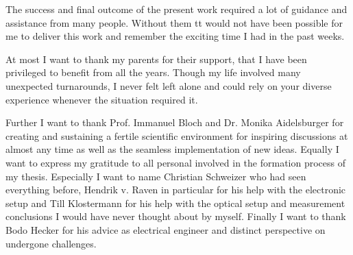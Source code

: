 
The success and final outcome of the present work required a lot of guidance
and assistance from many people. Without them tt would not have been possible
for me to deliver this work and remember the exciting time I had in the past
weeks.

At most I want to thank my parents for their support, that I have been
privileged to benefit from all the years. Though my life involved many
unexpected turnarounds, I never felt left alone and could rely on your
diverse experience whenever the situation required it.

Further I want to thank Prof. Immanuel Bloch and Dr. Monika Aidelsburger for
creating and sustaining a fertile scientific environment for inspiring
discussions at almost any time as well as the seamless implementation of new
ideas.
Equally I want to express my gratitude to all personal involved in the
formation process of my thesis. Especially I want to name Christian Schweizer
who had seen everything before, Hendrik v. Raven in particular for his help
with the electronic setup and Till Klostermann for his help with the optical
setup and measurement conclusions I would have never thought about by myself.
Finally I want to thank Bodo Hecker for his advice as electrical engineer and
distinct perspective on undergone challenges.
